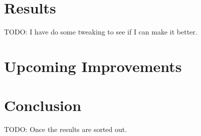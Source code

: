 \documentclass[conference]{IEEEtran}
\begin{document}
\section{Results}
\label{sec:results}

TODO:  I have do some tweaking to see if I can make it better.

\section{Upcoming Improvements}
\label{sec:improv}

\section{Conclusion}
\label{sec:concl}

TODO: Once the results are sorted out.



\end{document}

